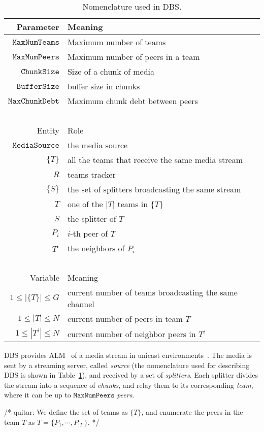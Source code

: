 \label{sec:DBS}

\begin{table}
  \begin{tabular}{rl}
    Parameter & Meaning \\
    \hline
    $\mathtt{MaxNumTeams}$  & Maximum number of teams \\
    $\mathtt{MaxMumPeers}$  & Maximum number of peers in a team \\
    $\mathtt{ChunkSize}$    & Size of a chunk of media \\
    $\mathtt{BufferSize}$   & buffer size in chunks \\
    $\mathtt{MaxChunkDebt}$ & Maximum chunk debt between peers \\
    ~\\
    Entity  & Role \\
    \hline
    $\mathtt{MediaSource}$  & the media source \\
    $\{T\}$ & all the teams that receive the same media stream \\
    $R$     & teams tracker \\
    $\{S\}$ & the set of splitters broadcasting the same stream \\
    $T$     & one of the $|T|$ teams in $\{T\}$ \\
    $S$     & the splitter of $T$ \\
    $P_i$   & $i$-th peer of $T$ \\
    $T^i$   & the neighbors of $P_i$ \\
    ~\\
    Variable            & Meaning \\
    \hline
    $1\leq |\{T\}|\leq G$ & current number of teams broadcasting the same channel \\
    $1\leq |T|\leq N$     & current number of peers in team $T$ \\
    $1\leq |T^i|\leq N$   & current number of neighbor peers in $T^i$ \\
  \end{tabular}
  \caption{Nomenclature used in DBS.\label{tab:DBS_nomenclature}}
\end{table}

DBS provides ALM~\cite{banerjee2002scalable} of a media stream in
unicast environments~\cite{comer2003computer}. The media is sent by a
streaming server, called \emph{source} (the nomenclature used for
describing DBS is shown in Table~\ref{tab:DBS_nomenclature}), and
received by a set of \emph{splitters}.  Each splitter divides the
stream into a sequence of \emph{chunks}, and relay them to its
corresponding \emph{team}, where it can be up to
$\mathtt{MaxNumPeers}$ \emph{peers}.

/* quitar: We define the set of teams as
$\{T\}$,
and enumerate the peers in the team $T$ as $T=\{P_1,\cdots,P_{|T|}\}$. */
